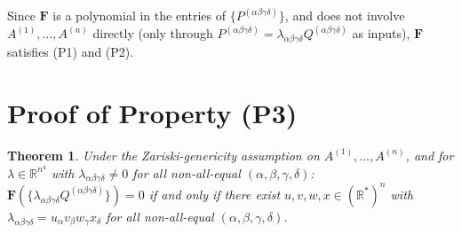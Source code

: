 \documentclass[12pt]{article}
\newtheorem{theorem}{Theorem}
\theoremstyle{definition}
\newcommand{\R}{\mathbb{R}}
\begin{document}
Since $\mathbf{F}$ is a polynomial in the entries of $\{P^{(\alpha\beta\gamma\delta)}\}$, and does not involve $A^{(1)},\ldots,A^{(n)}$ directly (only through $P^{(\alpha\beta\gamma\delta)} = \lambda_{\alpha\beta\gamma\delta}Q^{(\alpha\beta\gamma\delta)}$ as inputs), $\mathbf{F}$ satisfies (P1) and (P2).

\section{Proof of Property (P3)}

\begin{theorem}\label{thm:P3}
Under the Zariski-genericity assumption on $A^{(1)},\ldots,A^{(n)}$, and for $\lambda \in \R^{n^4}$ with $\lambda_{\alpha\beta\gamma\delta} \neq 0$ for all non-all-equal $(\alpha,\beta,\gamma,\delta)$:
$\mathbf{F}(\{\lambda_{\alpha\beta\gamma\delta}Q^{(\alpha\beta\gamma\delta)}\}) = 0$ if and only if there exist $u,v,w,x \in (\R^*)^n$ with $\lambda_{\alpha\beta\gamma\delta} = u_\alpha v_\beta w_\gamma x_\delta$ for all non-all-equal $(\alpha,\beta,\gamma,\delta)$.
\end{theorem}
\end{document}
